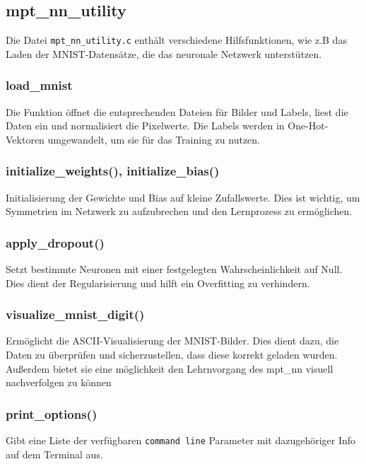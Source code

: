 \documentclass[a4paper, 12pt]{article}
\begin{document}
\subsection{mpt\_nn\_utility}
\label{subsec:mpt_nn_utility}

Die Datei \texttt{mpt\_nn\_utility.c} enthält verschiedene Hilfsfunktionen, wie z.B das Laden der MNIST-Datensätze, die das neuronale Netzwerk unterstützen.


\subsubsection{load\_mnist}

Die Funktion öffnet die entsprechenden Dateien für Bilder und Labels, liest die Daten ein und normalisiert die Pixelwerte. 
Die Labels werden in One-Hot-Vektoren umgewandelt, um sie für das Training zu nutzen.

\subsubsection{initialize\_weights(), initialize\_bias()}

Initialisierung der Gewichte und Bias auf kleine Zufallswerte. 
Dies ist wichtig, um Symmetrien im Netzwerk zu aufzubrechen und den Lernprozess zu ermöglichen.

\subsubsection{apply\_dropout()}

Setzt bestimmte Neuronen mit einer festgelegten Wahrscheinlichkeit auf Null. 
Dies dient der Regularisierung und hilft ein Overfitting zu verhindern.

\subsubsection{visualize\_mnist\_digit()}

Ermöglicht die ASCII-Visualisierung der MNIST-Bilder. 
Dies dient dazu, die Daten zu überprüfen und sicherzustellen, dass diese korrekt geladen wurden.
Außerdem bietet sie eine möglichkeit den Lehrnvorgang des mpt\_nn visuell nachverfolgen zu können 

\subsubsection{print\_options()}

Gibt eine Liste der verfügbaren \texttt{command line} Parameter mit dazugehöriger Info auf dem Terminal aus.
\end{document}
